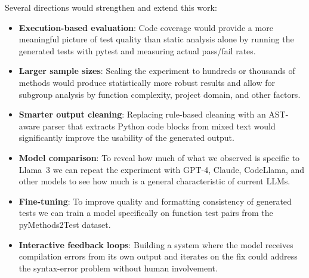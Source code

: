 \documentclass[conference]{IEEEtran}
\begin{document}
Several directions would strengthen and extend this work:

\begin{itemize}[leftmargin=*]
    \item \textbf{Execution-based evaluation}: Code coverage would provide a more meaningful picture of test quality than static analysis alone by running the generated tests with pytest and measuring actual pass/fail rates.
    \item \textbf{Larger sample sizes}: Scaling the experiment to hundreds or thousands of methods would produce statistically more robust results and allow for subgroup analysis by function complexity, project domain, and other factors.
    \item \textbf{Smarter output cleaning}: Replacing rule-based cleaning with an AST-aware parser that extracts Python code blocks from mixed text would significantly improve the usability of the generated output.
    \item \textbf{Model comparison}: To reveal how much of what we observed is specific to Llama~3 we can repeat the experiment with GPT-4, Claude, CodeLlama, and other models to see how much is a general characteristic of current LLMs.
    \item \textbf{Fine-tuning}: To improve quality and formatting consistency of generated tests we can train a model specifically on function test pairs from the pyMethods2Test dataset.
    \item \textbf{Interactive feedback loops}: Building a system where the model receives compilation errors from its own output and iterates on the fix could address the syntax-error problem without human involvement.
\end{itemize}
\end{document}
